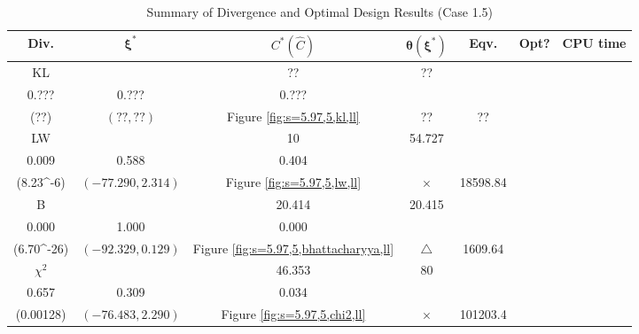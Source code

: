 \documentclass[12pt, a4paper]{article}
\begin{document}
\begin{table}[H]
\centering
\renewcommand{\arraystretch}{1.5} %
\setlength{\tabcolsep}{8pt} %
\begin{tabular}{|c|c|c|c|c|c|c|}
\hline
\textbf{Div.} & \(\boldsymbol{\xi^*}\) & \(C^* (\hat{C})\) & \(\boldsymbol{\hat{\theta}(\xi^*)}\) & \textbf{Eqv.} & \textbf{Opt?} & \textbf{CPU time} \\
\hline
KL & \(\left\{\begin{array}{ccc}
?? & ?? & ?? \\
0.??? & 0.??? & 0.???
\end{array}\right\}\) &
\(\begin{array}{c}
?? \\
(??)
\end{array}\) & 
\((??, ??)\) & 
Figure \ref{fig:s=5.97,5,kl,ll} & ?? & ?? \\
\hline
LW & \(\left\{\begin{array}{ccc}
10 & 10 & 54.727 \\
0.009 & 0.588 & 0.404
\end{array}\right\}\) &
\(\begin{array}{c}
0.000724 \\
(8.23\times 10^{-6})
\end{array}\) & 
\((-77.290, 2.314)\) & 
Figure \ref{fig:s=5.97,5,lw,ll} & $\times$ & 18598.84 \\
\hline
B & \(\left\{\begin{array}{ccc}
10 & 20.414 & 20.415 \\
0.000 & 1.000 & 0.000
\end{array}\right\}\) &
\(\begin{array}{c}
4.36\times 10^{-13} \\
(6.70\times 10^{-26})
\end{array}\) & 
\((-92.329, 0.129)\) & 
Figure \ref{fig:s=5.97,5,bhattacharyya,ll} & $\triangle$ & 1609.64 \\
\hline
\(\chi^2\) & \(\left\{\begin{array}{ccc}
10 & 46.353 & 80 \\
0.657 & 0.309 & 0.034
\end{array}\right\}\) &
\(\begin{array}{c}
0.00323 \\
(0.00128)
\end{array}\) & 
\((-76.483, 2.290)\) & 
Figure \ref{fig:s=5.97,5,chi2,ll} & $\times$ & 101203.4 \\
\hline
\end{tabular}
\caption{Summary of Divergence and Optimal Design Results (Case 1.5)}
\label{tab:results1.5}
\end{table}
\end{document}
